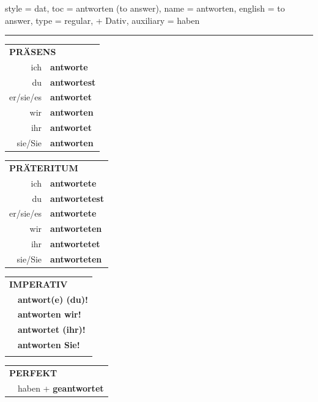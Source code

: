 \begin{verbentry}{
  style = {dat},
  toc = {antworten (to answer)},
  name = {antworten},
  english = {to answer},
  type = {regular, + Dativ},
  auxiliary = {haben}
}
 
    
     \vspace{5pt}

    \hrule
    
    \vspace{5pt}

  \begin{tabular}{rl}
     \multicolumn{2}{l}{\textbf{PRÄSENS} }\\
    ich & \textbf{antworte}\\
    du & \textbf{antwortest}\\
    er/sie/es & \textbf{antwortet}\\
    wir & \textbf{antworten}\\
    ihr & \textbf{antwortet}\\
    sie/Sie & \textbf{antworten}\\
  \end{tabular}
  \hfill
     \begin{tabular}{rl}
    \multicolumn{2}{l}{\textbf{PRÄTERITUM} }\\
    ich & \textbf{antwortete}\\
    du & \textbf{antwortetest}\\
    er/sie/es & \textbf{antwortete}\\
    wir & \textbf{antworteten}\\
    ihr & \textbf{antwortetet}\\
    sie/Sie & \textbf{antworteten}\\
  \end{tabular}
  \hfill
  \begin{tabular}{rl}
     \multicolumn{2}{l}{\textbf{IMPERATIV} }\\
   & \textbf{antwort(e) (du)!}\\
   & \textbf{antworten wir!}\\
   & \textbf{antwortet (ihr)!}\\
   & \textbf{antworten Sie!}\\
   & \vspace{10pt}
  \end{tabular}

    \vspace{10pt}

 \begin{tabular}{rl}
     \multicolumn{2}{l}{\textbf{PERFEKT}}\\
  &  haben + \textbf{geantwortet}\\
  \end{tabular}
\hfill
   \begin{tabular}{rl}
   

\end{tabular}
\end{verbentry}
